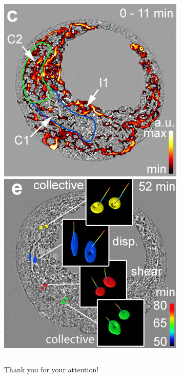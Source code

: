 \documentclass{beamer}
\begin{document}
\begin{frame}
\begin{columns}
    \vfill
    \includegraphics[width=\imw]{figures/analysis-overview/flow-diff}
    \vfill
    \includegraphics[width=\imw]{figures/analysis-overview/flow-int}

    

  \end{columns}
\end{frame}

\begin{frame}
  \begin{center}
    \Large  Thank you for your attention!    
  \end{center}
\end{frame}
\end{document}
